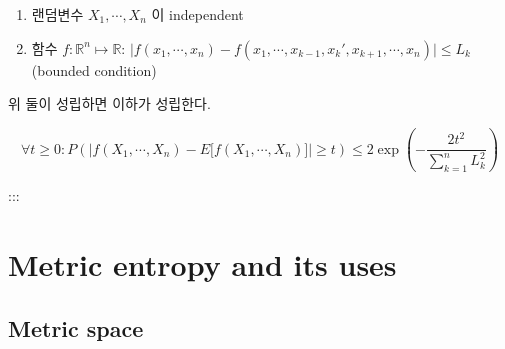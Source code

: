 \documentclass[
]{book}
\providecommand{\tightlist}{%
  \setlength{\itemsep}{0pt}\setlength{\parskip}{0pt}}
\begin{document}
{{{\begin{enumerate}
\def\labelenumi{\arabic{enumi}.}
\tightlist
\item
  랜덤변수 \(X_1 , \cdots, X_n\) 이 independent
\item
  함수 \(f: \mathbb R^n \mapsto \mathbb R\): \(\Big | f(x_1, \cdots, x_n) - f(x_1 , \cdots, x_{k-1} , x_k ' , x_{k+1} , \cdots, x_n) \Big | \le L_k\) (bounded condition)
\end{enumerate}

위 둘이 성립하면 이하가 성립한다.

\[
\forall t \ge 0: P \left( \Big | f(X_1 , \cdots, X_n) - E \big[ f(X_1 , \cdots, X_n) \big]\Big | \ge t \right) \le 2 \exp \left( - \frac{2 t^2}{\sum_{k=1}^n L_k^2}\right)
\]

:::

\hypertarget{section-2}{%
\subsection{}\label{section-2}}

\hypertarget{section-3}{%
\subsection{}\label{section-3}}

\hypertarget{section-4}{%
\subsection{}\label{section-4}}

\hypertarget{section-5}{%
\subsection{}\label{section-5}}

\hypertarget{section-6}{%
\subsection{}\label{section-6}}

\hypertarget{metric-entropy-and-its-uses}{%
\section{Metric entropy and its uses}\label{metric-entropy-and-its-uses}}

\hypertarget{metric-space}{%
\subsection{Metric space}\label{metric-space}}

}}}
\end{document}

